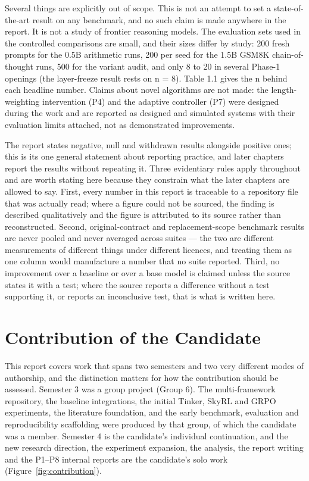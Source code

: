 \documentclass[12pt,a4paper]{report}
\begin{document}
Several things are explicitly out of scope. This is not an attempt to
set a state-of-the-art result on any benchmark, and no such claim is
made anywhere in the report. It is not a study of frontier reasoning
models. The evaluation sets used in the controlled comparisons are
small, and their sizes differ by study: 200 fresh prompts for the 0.5B
arithmetic runs, 200 per seed for the 1.5B GSM8K chain-of-thought runs,
500 for the variant audit, and only 8 to 20 in several Phase-1 openings
(the layer-freeze result rests on n = 8). Table 1.1 gives the n behind
each headline number. Claims about novel algorithms are not made: the
length-weighting intervention (P4) and the adaptive controller (P7) were
designed during the work and are reported as designed and simulated
systems with their evaluation limits attached, not as demonstrated
improvements.

The report states negative, null and withdrawn results alongside
positive ones; this is its one general statement about reporting
practice, and later chapters report the results without repeating it.
Three evidentiary rules apply throughout and are worth stating here
because they constrain what the later chapters are allowed to say.
First, every number in this report is traceable to a repository file
that was actually read; where a figure could not be sourced, the finding
is described qualitatively and the figure is attributed to its source
rather than reconstructed. Second, original-contract and
replacement-scope benchmark results are never pooled and never averaged
across suites --- the two are different measurements of different things
under different licences, and treating them as one column would
manufacture a number that no suite reported. Third, no improvement over
a baseline or over a base model is claimed unless the source states it
with a test; where the source reports a difference without a test
supporting it, or reports an inconclusive test, that is what is written
here.

\section{Contribution of the
Candidate}\label{contribution-of-the-candidate}

This report covers work that spans two semesters and two very different
modes of authorship, and the distinction matters for how the
contribution should be assessed. Semester 3 was a group project (Group
6). The multi-framework repository, the baseline integrations, the
initial Tinker, SkyRL and GRPO experiments, the literature foundation,
and the early benchmark, evaluation and reproducibility scaffolding were
produced by that group, of which the candidate was a member. Semester 4
is the candidate's individual continuation, and the new research
direction, the experiment expansion, the analysis, the report writing
and the P1--P8 internal reports are the candidate's solo work (Figure~\ref{fig:contribution}).
\end{document}
